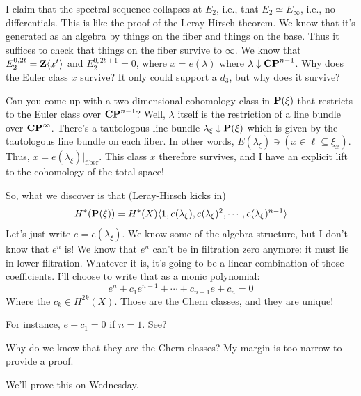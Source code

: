 I claim that the spectral sequence collapses at $E_2$, i.e., that $E_2 \simeq E_\infty$, i.e., no differentials.
This is like the proof of the Leray-Hirsch theorem.
We know that it's generated as an algebra by things on the fiber and things on the base.
Thus it suffices to check that things on the fiber survive to $\infty$.
We know that $E_2^{0,2t} = \mathbf Z\langle x^t\rangle$ and $E_2^{0,2t+1} = 0$, where $x = e(\lambda)$ where $\lambda\downarrow\mathbf{CP}^{n-1}$.
Why does the Euler class $x$ survive?
It only could support a $d_3$, but why does it survive?

Can you come up with a two dimensional cohomology class in $\mathbf P(\xi)$ that restricts to the Euler class over $\mathbf{CP}^{n-1}$?
Well, $\lambda$ itself is the restriction of a line bundle over $\mathbf{CP}^\infty$.
There's a tautologous line bundle $\lambda_\xi \downarrow \mathbf P(\xi)$ which is given by the tautologous line bundle on each fiber.
In other words, $E(\lambda_\xi)\ni(x\in \ell\subseteq\xi_x)$.
Thus, $x = e(\lambda_\xi)|_\text{fiber}$.
This class $x$ therefore survives, and I have an explicit lift to the cohomology of the total space!

So, what we discover is that (Leray-Hirsch kicks in)
$$
H^\ast(\mathbf P(\xi)) = H^\ast(X)\langle 1, e(\lambda_\xi), e(\lambda_\xi)^2, \cdots, e(\lambda_\xi)^{n-1}\rangle
$$
Let's just write $e = e(\lambda_\xi)$.
We know some of the algebra structure, but I don't know that $e^n$ is!
We know that $e^n$ can't be in filtration zero anymore: it must lie in lower filtration.
Whatever it is, it's going to be a linear combination of those coefficients.
I'll choose to write that as a monic polynomial:
$$
e^n + c_1e^{n-1} + \cdots + c_{n-1} e + c_n = 0
$$
Where the $c_k \in H^{2k}(X)$.
Those are the Chern classes, and they are unique!

For instance, $e+c_1 = 0$ if $n=1$. See?

\begin{question}
    Why do we know that they are the Chern classes?
    My margin is too narrow to provide a proof.
\end{question}
We'll prove this on Wednesday.
